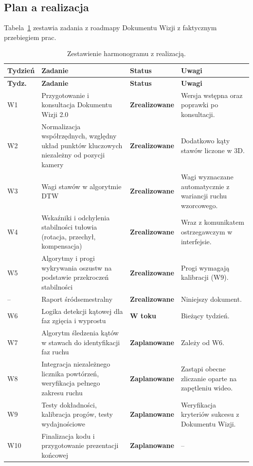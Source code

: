 \documentclass[11pt,a4paper]{article}
\newcommand{\done}{\textcolor{statusdone}{\textbf{Zrealizowane}}}
\newcommand{\inprog}{\textcolor{statusprog}{\textbf{W toku}}}
\newcommand{\planned}{\textcolor{statusplan}{\textbf{Zaplanowane}}}
\begin{document}
\subsection{Plan a realizacja}
Tabela~\ref{tab:plan} zestawia zadania z roadmapy Dokumentu Wizji z faktycznym przebiegiem prac.

{\small
\begin{longtable}{p{1.3cm} p{5.7cm} p{2.0cm} p{5.0cm}}
\caption{Zestawienie harmonogramu z realizacją.}\label{tab:plan}\\
\toprule
\textbf{Tydzień} & \textbf{Zadanie} & \textbf{Status} & \textbf{Uwagi} \\
\midrule
\endfirsthead
\toprule
\textbf{Tydz.} & \textbf{Zadanie} & \textbf{Status} & \textbf{Uwagi} \\
\midrule
\endhead
\bottomrule
\endfoot
W1 & Przygotowanie i konsultacja Dokumentu Wizji 2.0 & \done & Wersja wstępna oraz poprawki po konsultacji. \\
\addlinespace
W2 & Normalizacja współrzędnych, względny układ punktów kluczowych niezależny od pozycji kamery & \done & Dodatkowo kąty stawów liczone w 3D. \\
\addlinespace
W3 & Wagi stawów w algorytmie DTW & \done & Wagi wyznaczane automatycznie z wariancji ruchu wzorcowego. \\
\addlinespace
W4 & Wskaźniki i odchylenia stabilności tułowia (rotacja, przechył, kompensacja) & \done & Wraz z komunikatem ostrzegawczym w interfejsie. \\
\addlinespace
W5 & Algorytmy i progi wykrywania oszustw na podstawie przekroczeń stabilności & \done & Progi wymagają kalibracji (W9). \\
\addlinespace
-- & Raport śródsemestralny & \done & Niniejszy dokument. \\
\addlinespace
W6 & Logika detekcji kątowej dla faz zgięcia i wyprostu & \inprog & Bieżący tydzień. \\
\addlinespace
W7 & Algorytm śledzenia kątów w stawach do identyfikacji faz ruchu & \planned & Zależy od W6. \\
\addlinespace
W8 & Integracja niezależnego licznika powtórzeń, weryfikacja pełnego zakresu ruchu & \planned & Zastąpi obecne zliczanie oparte na zapętleniu wideo. \\
\addlinespace
W9 & Testy dokładności, kalibracja progów, testy wydajnościowe & \planned & Weryfikacja kryteriów sukcesu z Dokumentu Wizji. \\
\addlinespace
W10 & Finalizacja kodu i przygotowanie prezentacji końcowej & \planned & -- \\
\end{longtable}
}
\end{document}
